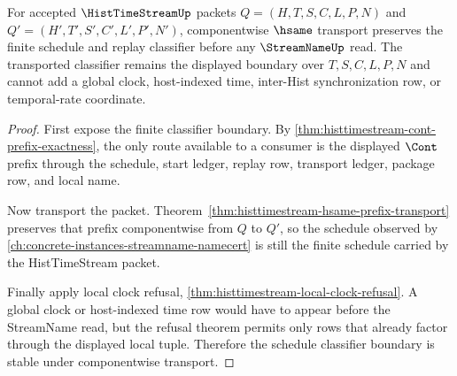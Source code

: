 \begin{theorem}
\label{thm:histtimestream-streamname-schedule-classifier-boundary}
For accepted $\HistTimeStreamUp$ packets $Q=(H,T,S,C,L,P,N)$ and $Q'=(H',T',S',C',L',P',N')$, componentwise $\hsame$ transport preserves the finite schedule and replay classifier before any $\StreamNameUp$ read. The transported classifier remains the displayed boundary over $T,S,C,L,P,N$ and cannot add a global clock, host-indexed time, inter-Hist synchronization row, or temporal-rate coordinate.
\end{theorem}
\begin{proof}
First expose the finite classifier boundary. By \autoref{thm:histtimestream-cont-prefix-exactness}, the only route available to a consumer is the displayed $\Cont$ prefix through the schedule, start ledger, replay row, transport ledger, package row, and local name.

Now transport the packet. Theorem~\ref{thm:histtimestream-hsame-prefix-transport} preserves that prefix componentwise from $Q$ to $Q'$, so the schedule observed by \autoref{ch:concrete-instances-streamname-namecert} is still the finite schedule carried by the HistTimeStream packet.

Finally apply local clock refusal, \autoref{thm:histtimestream-local-clock-refusal}. A global clock or host-indexed time row would have to appear before the StreamName read, but the refusal theorem permits only rows that already factor through the displayed local tuple. Therefore the schedule classifier boundary is stable under componentwise transport.
\end{proof}

